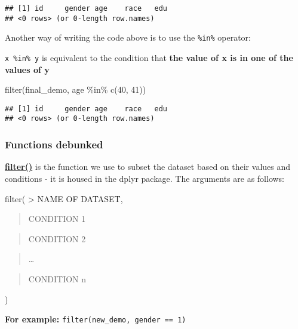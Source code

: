 \documentclass[
]{book}
\newenvironment{Shaded}{\begin{snugshade}}{\end{snugshade}}
\newcommand{\DecValTok}[1]{\textcolor[rgb]{0.00,0.00,0.81}{#1}}
\newcommand{\FunctionTok}[1]{\textcolor[rgb]{0.00,0.00,0.00}{#1}}
\newcommand{\NormalTok}[1]{#1}
\newcommand{\SpecialCharTok}[1]{\textcolor[rgb]{0.00,0.00,0.00}{#1}}
\begin{document}
\begin{verbatim}
## [1] id     gender age    race   edu   
## <0 rows> (or 0-length row.names)
\end{verbatim}

Another way of writing the code above is to use the \texttt{\%in\%} operator:

\texttt{x\ \%in\%\ y} is equivalent to the condition that \textbf{the value of x is in one of the values of y}

\begin{Shaded}
\begin{Highlighting}[]
\FunctionTok{filter}\NormalTok{(final\_demo, age }\SpecialCharTok{\%in\%} \FunctionTok{c}\NormalTok{(}\DecValTok{40}\NormalTok{, }\DecValTok{41}\NormalTok{))}
\end{Highlighting}
\end{Shaded}

\begin{verbatim}
## [1] id     gender age    race   edu   
## <0 rows> (or 0-length row.names)
\end{verbatim}

\hypertarget{functions-debunked-12}{%
\subsubsection{Functions debunked}\label{functions-debunked-12}}

\href{https://www.rdocumentation.org/packages/dplyr/versions/0.7.8/topics/filter}{\textbf{filter()}} is the function we use to subset the dataset based on their values and conditions - it is housed in the dplyr package. The arguments are as follows:

filter(
\textgreater{} NAME OF DATASET,

\begin{quote}
CONDITION 1
\end{quote}

\begin{quote}
CONDITION 2
\end{quote}

\begin{quote}
\ldots{}
\end{quote}

\begin{quote}
CONDITION n
\end{quote}

)

\textbf{For example:} \texttt{filter(new\_demo,\ gender\ ==\ 1)}
\end{document}
